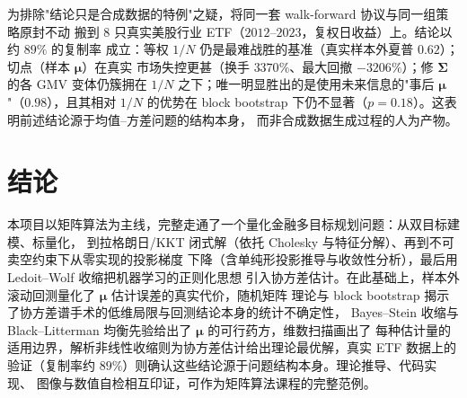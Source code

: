 \documentclass[12pt]{ctexart}
\newcommand{\muv}{\bm{\mu}}
\newcommand{\Sig}{\bm{\Sigma}}
\theoremstyle{definition}
\theoremstyle{plain}
\begin{document}
为排除"结论只是合成数据的特例"之疑，将同一套 walk-forward 协议与同一组策略原封不动
搬到 $8$ 只真实美股行业 ETF（$2012$--$2023$，复权日收益）上。结论以约 $89\%$ 的复制率
成立：等权 $1/N$ 仍是最难战胜的基准（真实样本外夏普 $0.62$）；切点（样本 $\muv$）在真实
市场失控更甚（换手 $3370\%$、最大回撤 $-3206\%$）；修 $\Sig$ 的各 GMV 变体仍簇拥在 $1/N$
之下；唯一明显胜出的是使用未来信息的"事后 $\muv$"（$0.98$），且其相对 $1/N$ 的优势在
block bootstrap 下仍不显著（$p=0.18$）。这表明前述结论源于均值--方差问题的结构本身，
而非合成数据生成过程的人为产物。

\section{结论}

本项目以矩阵算法为主线，完整走通了一个量化金融多目标规划问题：从双目标建模、标量化，
到拉格朗日/KKT 闭式解（依托 Cholesky 与特征分解）、再到不可卖空约束下从零实现的投影梯度
下降（含单纯形投影推导与收敛性分析），最后用 Ledoit--Wolf 收缩把机器学习的正则化思想
引入协方差估计。在此基础上，样本外滚动回测量化了 $\muv$ 估计误差的真实代价，随机矩阵
理论与 block bootstrap 揭示了协方差谱手术的低维局限与回测结论本身的统计不确定性，
Bayes--Stein 收缩与 Black--Litterman 均衡先验给出了 $\muv$ 的可行药方，维数扫描画出了
每种估计量的适用边界，解析非线性收缩则为协方差估计给出理论最优解，真实 ETF 数据上的
验证（复制率约 $89\%$）则确认这些结论源于问题结构本身。理论推导、代码实现、
图像与数值自检相互印证，可作为矩阵算法课程的完整范例。
\end{document}
